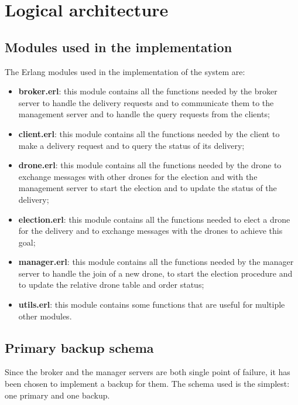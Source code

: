 \documentclass[a4paper, oneside]{memoir}
\begin{document}
\section{Logical architecture}
\subsection{Modules used in the implementation}
The Erlang modules used in the implementation of the system are:
\begin{itemize}
\item \textbf{broker.erl}: this module contains all the functions needed by the broker server to handle the delivery requests and to communicate them to the management server and to handle the query requests from the clients;
\item \textbf{client.erl}: this module contains all the functions needed by the client to make a delivery request and to query the status of its delivery;
\item \textbf{drone.erl}: this module contains all the functions needed by the drone to exchange messages with other drones for the election and with the management server to start the election and to update the status of the delivery;
\item \textbf{election.erl}: this module contains all the functions needed to elect a drone for the delivery and to exchange messages with the drones to achieve this goal;

\item \textbf{manager.erl}: this module contains all the functions needed by the manager server to handle the join of a new drone, to start the election procedure and to update the relative drone table and order status;
\item \textbf{utils.erl}: this module contains some functions that are useful for multiple other modules.
\end{itemize}


\subsection{Primary backup schema}
\label{Primary-backup-schema}
Since the broker and the manager servers are both single point of failure, it has been chosen to implement a backup for them. The schema used is the simplest: one primary and one backup.
\end{document}
